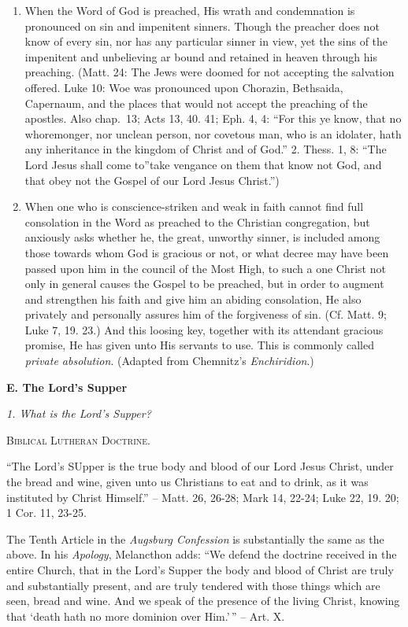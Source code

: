 \documentclass[
]{book}
\begin{document}
\begin{enumerate}
\def\labelenumi{\arabic{enumi}.}
\item
  When the Word of God is preached, His wrath and condemnation is pronounced on sin and impenitent sinners. Though the preacher does not know of every sin, nor has any particular sinner in view, yet the sins of the impenitent and unbelieving ar bound and retained in heaven through his preaching. (Matt. 24: The Jews were doomed for not accepting the salvation offered. Luke 10: Woe was pronounced upon Chorazin, Bethsaida, Capernaum, and the places that would not accept the preaching of the apostles. Also chap.~13; Acts 13, 40. 41; Eph. 4, 4: ``For this ye know, that no whoremonger, nor unclean person, nor covetous man, who is an idolater, hath any inheritance in the kingdom of Christ and of God.'' 2. Thess. 1, 8: ``The Lord Jesus shall come to''take vengance on them that know not God, and that obey not the Gospel of our Lord Jesus Christ.'')
\item
  When one who is conscience-striken and weak in faith cannot find full consolation in the Word as preached to the Christian congregation, but anxiously asks whether he, the great, unworthy sinner, is included among those towards whom God is gracious or not, or what decree may have been passed upon him in the council of the Most High, to such a one Christ not only in general causes the Gospel to be preached, but in order to augment and strengthen his faith and give him an abiding consolation, He also privately and personally assures him of the forgiveness of sin. (Cf. Matt. 9; Luke 7, 19. 23.) And this loosing key, together with its attendant gracious promise, He has given unto His servants to use. This is commonly called \emph{private absolution}. (Adapted from Chemnitz's \emph{Enchiridion}.)
\end{enumerate}

\begin{center}
\textbf{E.  The Lord's Supper}

\textsl{1.  What is the Lord's Supper?}

\textsc{Biblical Lutheran Doctrine.}
\end{center}

``The Lord's SUpper is the true body and blood of our Lord Jesus Christ, under the bread and wine, given unto us Christians to eat and to drink, as it was instituted by Christ Himself.'' -- Matt. 26, 26-28; Mark 14, 22-24; Luke 22, 19. 20; 1 Cor. 11, 23-25.

The Tenth Article in the \emph{Augsburg Confession} is substantially the same as the above. In his \emph{Apology}, Melancthon adds: ``We defend the doctrine received in the entire Church, that in the Lord's Supper the body and blood of Christ are truly and substantially present, and are truly tendered with those things which are seen, bread and wine. And we speak of the presence of the living Christ, knowing that `death hath no more dominion over Him.'\,'' -- Art. X.
\end{document}
